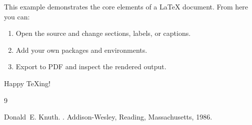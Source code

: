 \documentclass[11pt]{article}
\theoremstyle{definition}
\theoremstyle{plain}
\begin{document}
This example demonstrates the core elements of a \LaTeX{} document.
From here you can:

\begin{enumerate}[noitemsep]
    \item Open the source and change sections, labels, or captions.
    \item Add your own packages and environments.
    \item Export to PDF and inspect the rendered output.
\end{enumerate}

Happy \TeX ing!


\begin{thebibliography}{9}

Donald~E. Knuth.
.
\newblock Addison-Wesley, Reading, Massachusetts, 1986.

\end{thebibliography}
\end{document}
